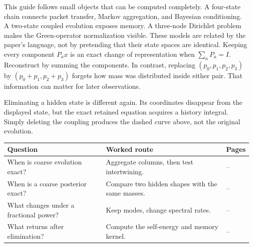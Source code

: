 \begingroup
{}\fontsize{10.5}{12.6}\selectfont
\setlength{\parskip}{4pt}
\setlength{\abovedisplayskip}{6pt}\setlength{\belowdisplayskip}{6pt}
This guide follows small objects that can be computed completely. A four-state chain connects packet transfer, Markov aggregation, and Bayesian conditioning. A two-state coupled evolution exposes memory. A three-node Dirichlet problem makes the Green-operator normalization visible. These models are related by the paper's language, not by pretending that their state spaces are identical.
Keeping every component $P_a x$ is an exact change of representation when $\sum_aP_a=I$. Reconstruct by summing the components. In contrast, replacing $(p_0,p_1,p_2,p_3)$ by $(p_0+p_1,p_2+p_3)$ forgets how mass was distributed inside either pair. That information can matter for later observations.

Eliminating a hidden state is different again. Its coordinates disappear from the displayed state, but the exact retained equation acquires a history integral. Simply deleting the coupling produces the dashed curve above, not the original evolution.
\begin{center}\small
\begin{tabularx}{\linewidth}{@{}lYl@{}}\toprule
Question & Worked route & Pages\\\midrule
When is coarse evolution exact? & Aggregate columns, then test intertwining. & --\\
When is a coarse posterior exact? & Compare two hidden shapes with the same masses. & --\\
What changes under a fractional power? & Keep modes, change spectral rates. & --\\
What returns after elimination? & Compute the self-energy and memory kernel. & --\\\bottomrule
\end{tabularx}\end{center}

